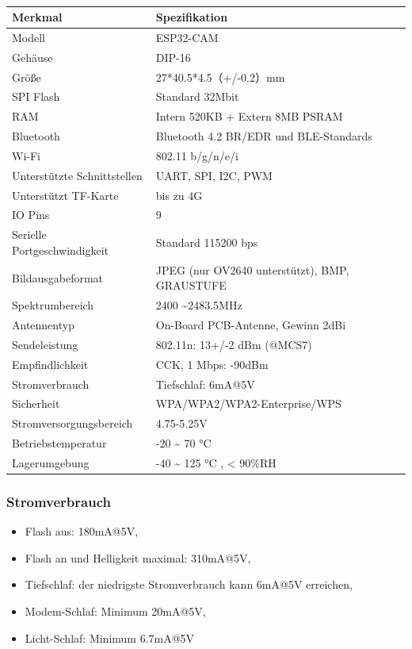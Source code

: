 \documentclass{vorlage-design-main}
\begin{document}
\begin{table}[!ht]
\caption{}%
\begin{tabular}{@{}ll@{}}

\toprule
Merkmal & Spezifikation \\
\midrule[\heavyrulewidth]

Modell & ESP32-CAM \\
Gehäuse & DIP-16 \\
Größe & 27*40.5*4.5（+/-0.2）mm \\
SPI Flash & Standard 32Mbit \\
RAM & Intern 520KB + Extern 8MB PSRAM \\
Bluetooth & Bluetooth 4.2 BR/EDR und BLE-Standards \\
Wi-Fi & 802.11 b/g/n/e/i \\
Unterstützte Schnittstellen & UART, SPI, I2C, PWM \\
Unterstützt TF-Karte & bis zu 4G \\
IO Pins & 9 \\
Serielle Portgeschwindigkeit & Standard 115200 bps \\
Bildausgabeformat & JPEG (nur OV2640 unterstützt), BMP, GRAUSTUFE \\
Spektrumbereich & 2400 \textasciitilde2483.5MHz \\
Antennentyp & On-Board PCB-Antenne, Gewinn 2dBi \\
Sendeleistung & 802.11n: 13+/-2 dBm (@MCS7) \\
Empfindlichkeit & CCK, 1 Mbps: -90dBm \\
Stromverbrauch & Tiefschlaf: 6mA@5V \\
Sicherheit & WPA/WPA2/WPA2-Enterprise/WPS \\
Stromversorgungsbereich & 4.75-5.25V \\
Betriebstemperatur & -20 \textasciitilde{} 70 °C \\
Lagerumgebung & -40 \textasciitilde{} 125 °C , \textless{} 90\%RH \\
\bottomrule

\end{tabular}
\floatnotes{}
\end{table}

\hypertarget{stromverbrauch}{%
\subsubsection{Stromverbrauch}\label{stromverbrauch}}

\begin{itemize}

\item
  Flash aus: 180mA@5V,
\item
  Flash an und Helligkeit maximal: 310mA@5V,
\item
  Tiefschlaf: der niedrigste Stromverbrauch kann 6mA@5V erreichen,
\item
  Modem-Schlaf: Minimum 20mA@5V,
\item
  Licht-Schlaf: Minimum 6.7mA@5V
\end{itemize}
\end{document}
